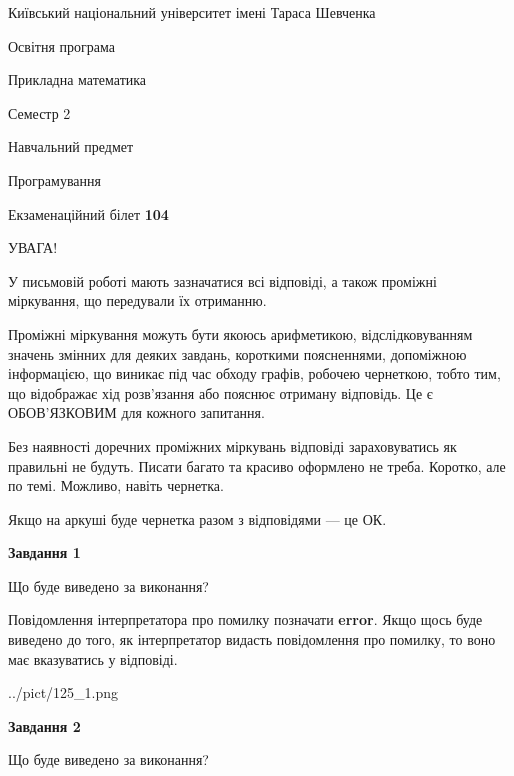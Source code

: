 \documentclass[12pt, ukrainian]{article}
\begin{document}
{{\begin {small}\par
{ \center  Київський національний університет імені Тараса Шевченка \par}
{\parbox {5 cm}{Освітня програма \hfill}{\parbox {7 cm}{Прикладна математика \hfill}}\parbox {6 cm}{\hfill Семестр 2}}\par
{\parbox {5 cm} {Навчальний предмет \hfill}\parbox {7 cm}{Програмування \hfill}\parbox {6cm}{\hfill}\par}\vspace{-7pt} \end{small}}{\center Екзаменаційний білет \No \textbf
{ 104 }\par}}
{
\begin {large}
УВАГА!

У письмовій роботі мають зазначатися всі відповіді, а також проміжні міркування, що передували їх отриманню.

Проміжні міркування можуть бути якоюсь арифметикою, відслідковуванням зна\-чень змінних для деяких завдань,
короткими поясненнями, допоміжною інформацією, що виникає під час обходу графів, робочею чернеткою,
тобто тим, що відображає хід розв’язання або пояснює отриману відповідь.
Це є ОБОВ’ЯЗКОВИМ для кожного запитання.

Без наявності доречних проміжних міркувань відповіді зараховуватись як правиль\-ні не будуть.
Писати багато та красиво оформлено не треба. Коротко, але по темі. Можли\-во, навіть чернетка.

Якщо на аркуші буде чернетка разом з відповідями --- це ОК.

\newpage

{\begin {center}\textbf{Завдання 1}\end {center}}\par
Що буде виведено за виконання?

Повідомлення інтерпретатора про помилку позначати \textbf{error}.
Якщо щось буде виведено до того, як інтерпретатор видасть повідомлення про помилку, 
то воно має вказуватись у відповіді. \par


\begin{center}
	{../pict/125_1.png}
\end{center}
\newpage

{\begin {center}\textbf{Завдання 2}\end {center}}\par
Що буде виведено за виконання?


\end{large}}
\end{document}
